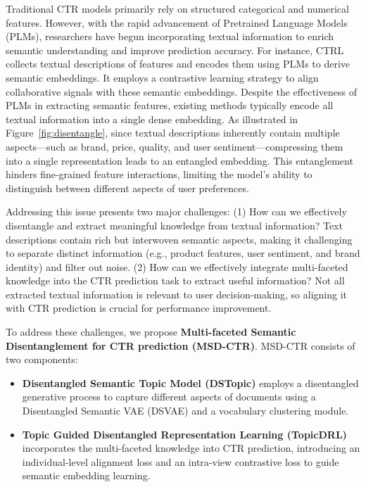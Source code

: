 Traditional CTR models primarily rely on structured categorical and numerical features. However, with the rapid advancement of Pretrained Language Models (PLMs), researchers have begun incorporating textual information to enrich semantic understanding and improve prediction accuracy. For instance, CTRL collects textual descriptions of features and encodes them using PLMs to derive semantic embeddings. It employs a contrastive learning strategy to align collaborative signals with these semantic embeddings. Despite the effectiveness of PLMs in extracting semantic features, existing methods typically encode all textual information into a single dense embedding. As illustrated in Figure~\ref{fig:disentangle}, since textual descriptions inherently contain multiple aspects—such as brand, price, quality, and user sentiment—compressing them into a single representation leads to an entangled embedding. This entanglement hinders fine-grained feature interactions, limiting the model’s ability to distinguish between different aspects of user preferences.

Addressing this issue presents two major challenges: 
(1) How can we effectively disentangle and extract meaningful knowledge from textual information? Text descriptions contain rich but interwoven semantic aspects, making it challenging to separate distinct information (e.g., product features, user sentiment, and brand identity) and filter out noise. 
(2) How can we effectively integrate multi-faceted knowledge into the CTR prediction task to extract useful information? Not all extracted textual information is relevant to user decision-making, so aligning it with CTR prediction is crucial for performance improvement.

To address these challenges, we propose \textbf{Multi-faceted Semantic Disentanglement for CTR prediction (MSD-CTR)}. MSD-CTR consists of two components: 
\begin{itemize}
    \item \textbf{Disentangled Semantic Topic Model (DSTopic)} employs a disentangled generative process to capture different aspects of documents using a Disentangled Semantic VAE (DSVAE) and a vocabulary clustering module.
    \item \textbf{Topic Guided Disentangled Representation Learning (TopicDRL)} incorporates the multi-faceted knowledge into CTR prediction, introducing an individual-level alignment loss and an intra-view contrastive loss to guide semantic embedding learning.
\end{itemize}

